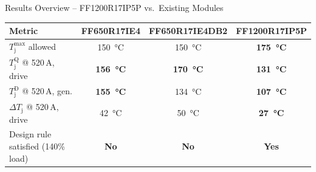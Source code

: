 \documentclass[aspectratio=169, 10pt]{beamer}
\newcommand{\good}[1]{\textcolor{goodgreen}{\textbf{#1}}}
\newcommand{\warn}[1]{\textcolor{warnred}{\textbf{#1}}}
\begin{document}
\begin{frame}{Results Overview -- FF1200R17IP5P vs.\ Existing Modules}
  \centering
  \renewcommand{\arraystretch}{1.5}
  \begin{tabularx}{0.9\textwidth}{X c c c}
    \toprule
    \textbf{Metric} & \textbf{FF650R17IE4} & \textbf{FF650R17IE4DB2} & \textbf{FF1200R17IP5P} \\
    \midrule
    \rowcolor{rowgray}
    $T_\text{j}^\text{max}$ allowed       & \SI{150}{\celsius} & \SI{150}{\celsius} & \good{\SI{175}{\celsius}} \\
    $T_\text{j}^\text{Q}$ @ 520\,A, drive & \warn{\SI{156}{\celsius}} & \warn{\SI{170}{\celsius}} & \good{\SI{131}{\celsius}} \\
    \rowcolor{rowgray}
    $T_\text{j}^\text{D}$ @ 520\,A, gen.  & \warn{\SI{155}{\celsius}} & \SI{134}{\celsius}         & \good{\SI{107}{\celsius}} \\
    $\Delta T_\text{j}$ @ 520\,A, drive   & \SI{42}{\celsius}          & \SI{50}{\celsius}          & \good{\SI{27}{\celsius}}  \\
    \rowcolor{rowgray}
    Design rule satisfied (140\% load)    & \warn{No}          & \warn{No}          & \good{Yes} \\
    \bottomrule
  \end{tabularx}
\end{frame}
\end{document}
